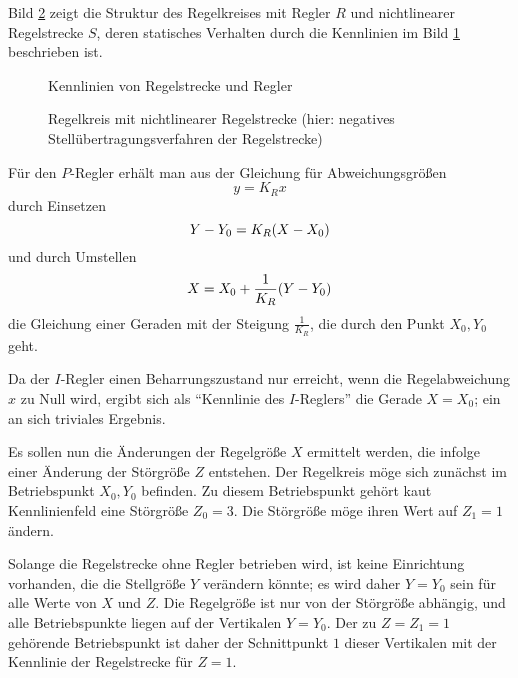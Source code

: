 Bild \ref{fig:2-7} zeigt die Struktur des Regelkreises mit Regler \(R\) und nichtlinearer Regelstrecke \(S\), deren statisches Verhalten durch die Kennlinien im Bild \ref{fig:2-6} beschrieben ist.

\begin{figure}[h]
    \centering
    \caption{Kennlinien von Regelstrecke und Regler}
    \label{fig:2-6}
\end{figure}

\begin{figure}[h]
    \centering
    \caption{Regelkreis mit nichtlinearer Regelstrecke (hier: negatives Stellübertragungsverfahren der Regelstrecke)}
    \label{fig:2-7}
\end{figure}

Für den \(P\)-Regler erhält man aus der Gleichung für Abweichungsgrößen
\begin{equation}
    y = K_R x
\end{equation}
durch Einsetzen
\begin{equation}
    Y - Y_0 = K_R \parentheses*{X - X_0}
\end{equation}
und durch Umstellen
\begin{equation}
    X = X_0 + \frac{1}{K_R}\parentheses*{Y - Y_0}
\end{equation}
die Gleichung einer Geraden mit der Steigung \(\frac{1}{K_R}\), die durch den Punkt \(X_0, Y_0\) geht.

Da der \(I\)-Regler einen Beharrungszustand nur erreicht, wenn die Regelabweichung \(x\) zu Null wird, ergibt sich als ``Kennlinie des \(I\)-Reglers'' die Gerade \(X = X_0\); ein an sich triviales Ergebnis.

Es sollen nun die Änderungen der Regelgröße \(X\) ermittelt werden, die infolge einer Änderung der Störgröße \(Z\) entstehen.
Der Regelkreis möge sich zunächst im Betriebspunkt \(X_0, Y_0\) befinden.
Zu diesem Betriebspunkt gehört kaut Kennlinienfeld eine Störgröße \(Z_0 = 3\).
Die Störgröße möge ihren Wert auf \(Z_1 = 1\) ändern.

Solange die Regelstrecke ohne Regler betrieben wird, ist keine Einrichtung vorhanden, die die Stellgröße \(Y\) verändern könnte; es wird daher \(Y = Y_0\) sein für alle Werte von \(X\) und \(Z\).
Die Regelgröße ist nur von der Störgröße abhängig, und alle Betriebspunkte liegen auf der Vertikalen \(Y = Y_0\).
Der zu \(Z = Z_1 = 1\) gehörende Betriebspunkt ist daher der Schnittpunkt \(1\) dieser Vertikalen mit der Kennlinie der Regelstrecke für \(Z = 1\).

